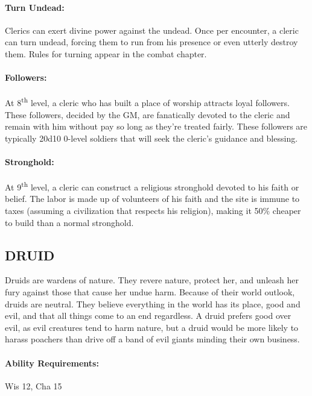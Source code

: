\begin{multicols}{2}
\paragraph{Turn Undead:} Clerics can exert divine power against the undead.  Once per encounter, a cleric can turn undead, forcing them to run from his presence or even utterly destroy them.  Rules for turning appear in the combat chapter. 

\paragraph{Followers:} At 8\textsuperscript{th} level, a cleric who has built a place of worship attracts loyal followers.  These followers, decided by the GM, are fanatically devoted to the cleric and remain with him without pay so long as they're treated fairly.  These followers are typically 20d10 0-level soldiers that will seek the cleric's guidance and blessing.

\paragraph{Stronghold:} At 9\textsuperscript{th} level, a cleric can construct a religious stronghold devoted to his faith or belief.  The labor is made up of volunteers of his faith and the site is immune to taxes (assuming a civilization that respects his religion), making it 50\% cheaper to build than a normal stronghold.
 
\subsection{DRUID}

Druids are wardens of nature.  They revere nature, protect her, and unleash her fury against those that cause her undue harm.  Because of their world outlook, druids are neutral.  They believe everything in the world has its place, good and evil, and that all things come to an end regardless.  A druid prefers good over evil, as evil creatures tend to harm nature, but a druid would be more likely to harass poachers than drive off a band of evil giants minding their own business.

\paragraph{Ability Requirements:} Wis 12, Cha 15


\end{multicols}
